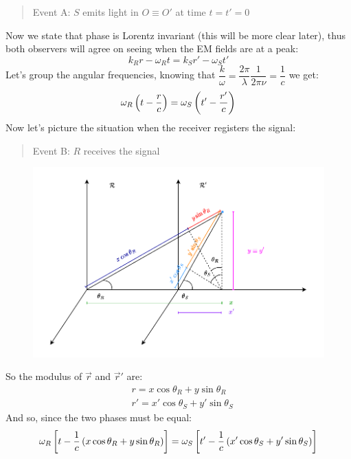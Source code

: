 \begin{quotation}
  Event A: $S$ emits light in $O \equiv O'$ at time $t = t' = 0$
\end{quotation}
Now we state that phase is Lorentz invariant (this will be more clear later), thus both observers will agree on seeing when the EM fields are at a peak:
\begin{equation}
  k_{R}r-\omega_{R} t = k_{S}r' - \omega_{S} t'
\end{equation}
Let's group the angular frequencies, knowing that $\dfrac{k}{\omega} = \dfrac{2\pi}{\lambda}\dfrac{1}{2\pi\nu} = \dfrac{1}{c}$ we get:
\begin{equation}
  \omega_{R}\left(t-\dfrac{r}{c}\right) = \omega_{S}\left(t'-\dfrac{r'}{c}\right)
\end{equation}
Now let's picture the situation when the receiver registers the signal:
\begin{quotation}
  Event B: $R$ receives the signal
\end{quotation}
\begin{figure}[H]
  \centering
  \includegraphics[width=0.8\linewidth]{res/svg/Doppler_geometry.drawio}
\end{figure}
So the modulus of $\vec{r}$ and $\vec{r}'$ are:
\begin{equation}
  \begin{split}
    &r = x\cos\theta_R + y\sin\theta_R \\[8pt]
    &r' = x'\cos\theta_S + y'\sin\theta_S
  \end{split}
\end{equation}
And so, since the two phases must be equal:
\begin{equation}
  \omega_{R}\left[t-\dfrac{1}{c}\left(x\cos\theta_R + y\sin\theta_R\right)\right] = \omega_{S}\left[t'-\dfrac{1}{c}\left(x'\cos\theta_S + y'\sin\theta_S\right)\right]
\end{equation}
